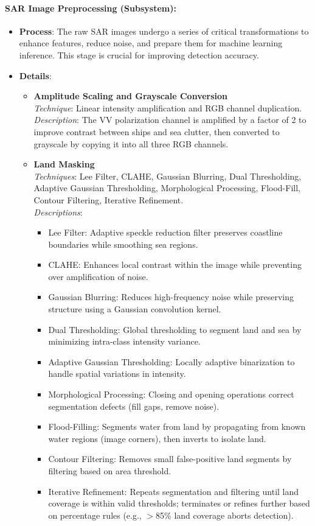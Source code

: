 \documentclass{article}
\begin{document}
\paragraph{SAR Image Preprocessing (Subsystem):}
\begin{itemize}
	\item \textbf{Process}: The raw SAR images undergo a series of critical transformations to enhance features, reduce noise, and prepare them for machine learning inference. This stage is crucial for improving detection accuracy.
	
	\item \textbf{Details}:
	\begin{itemize}
		
		\item \textbf{Amplitude Scaling and Grayscale Conversion} \\
		\textit{Technique}: Linear intensity amplification and RGB channel duplication. \\
		\textit{Description}: The VV polarization channel is amplified by a factor of 2 to improve contrast between ships and sea clutter, then converted to grayscale by copying it into all three RGB channels.
		
		\item \textbf{Land Masking} \\
		\textit{Techniques}: Lee Filter, CLAHE, Gaussian Blurring, Dual Thresholding, Adaptive Gaussian Thresholding, Morphological Processing, Flood-Fill, Contour Filtering, Iterative Refinement. \\
		\textit{Descriptions}: 
		\begin{itemize}
			\item Lee Filter: Adaptive speckle reduction filter preserves coastline boundaries while smoothing sea regions.
			\item CLAHE: Enhances local contrast within the image while preventing over amplification of noise.
			\item Gaussian Blurring: Reduces high-frequency noise while preserving structure using a Gaussian convolution kernel.
			\item Dual Thresholding: Global thresholding to segment land and sea by minimizing intra-class intensity variance.
			\item Adaptive Gaussian Thresholding: Locally adaptive binarization to handle spatial variations in intensity.
			\item Morphological Processing: Closing and opening operations correct segmentation defects (fill gaps, remove noise).
			\item Flood-Filling: Segments water from land by propagating from known water regions (image corners), then inverts to isolate land.
			\item Contour Filtering: Removes small false-positive land segments by filtering based on area threshold.
			\item Iterative Refinement: Repeats segmentation and filtering until land coverage is within valid thresholds; terminates or refines further based on percentage rules (e.g., $>$85\% land coverage aborts detection).
			

\end{itemize}
\end{itemize}
\end{itemize}
\end{document}

